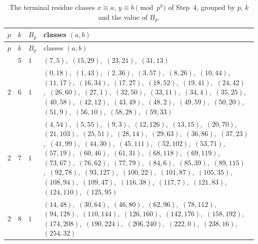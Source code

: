 \documentclass[11pt]{article}
\begin{document}
\begingroup\small
\setlength{\LTcapwidth}{\textwidth}
\begin{longtable}{@{}rrl>{\raggedright\arraybackslash}p{}@{}}
\caption{The terminal residue classes $x\equiv a$, $y\equiv b\pmod{p^k}$ of Step~4, grouped by $p$, $k$ and the value of $B_p$.}\label{tab:local}\\
\hline $p$ & $k$ & $B_p$ & classes $(a,b)$\\\hline\endfirsthead
\hline $p$ & $k$ & $B_p$ & classes $(a,b)$\\\hline\endhead\hline\endfoot
2 & 5 & $1$ & $(7,5)$,\allowbreak\ $(15,29)$,\allowbreak\ $(23,21)$,\allowbreak\ $(31,13)$\\
2 & 6 & $1$ & $(0,18)$,\allowbreak\ $(1,43)$,\allowbreak\ $(2,36)$,\allowbreak\ $(3,57)$,\allowbreak\ $(8,26)$,\allowbreak\ $(10,44)$,\allowbreak\ $(11,17)$,\allowbreak\ $(16,34)$,\allowbreak\ $(17,27)$,\allowbreak\ $(18,52)$,\allowbreak\ $(19,41)$,\allowbreak\ $(24,42)$,\allowbreak\ $(26,60)$,\allowbreak\ $(27,1)$,\allowbreak\ $(32,50)$,\allowbreak\ $(33,11)$,\allowbreak\ $(34,4)$,\allowbreak\ $(35,25)$,\allowbreak\ $(40,58)$,\allowbreak\ $(42,12)$,\allowbreak\ $(43,49)$,\allowbreak\ $(48,2)$,\allowbreak\ $(49,59)$,\allowbreak\ $(50,20)$,\allowbreak\ $(51,9)$,\allowbreak\ $(56,10)$,\allowbreak\ $(58,28)$,\allowbreak\ $(59,33)$\\
2 & 7 & $1$ & $(4,54)$,\allowbreak\ $(5,55)$,\allowbreak\ $(9,3)$,\allowbreak\ $(12,126)$,\allowbreak\ $(13,15)$,\allowbreak\ $(20,70)$,\allowbreak\ $(21,103)$,\allowbreak\ $(25,51)$,\allowbreak\ $(28,14)$,\allowbreak\ $(29,63)$,\allowbreak\ $(36,86)$,\allowbreak\ $(37,23)$,\allowbreak\ $(41,99)$,\allowbreak\ $(44,30)$,\allowbreak\ $(45,111)$,\allowbreak\ $(52,102)$,\allowbreak\ $(53,71)$,\allowbreak\ $(57,19)$,\allowbreak\ $(60,46)$,\allowbreak\ $(61,31)$,\allowbreak\ $(68,118)$,\allowbreak\ $(69,119)$,\allowbreak\ $(73,67)$,\allowbreak\ $(76,62)$,\allowbreak\ $(77,79)$,\allowbreak\ $(84,6)$,\allowbreak\ $(85,39)$,\allowbreak\ $(89,115)$,\allowbreak\ $(92,78)$,\allowbreak\ $(93,127)$,\allowbreak\ $(100,22)$,\allowbreak\ $(101,87)$,\allowbreak\ $(105,35)$,\allowbreak\ $(108,94)$,\allowbreak\ $(109,47)$,\allowbreak\ $(116,38)$,\allowbreak\ $(117,7)$,\allowbreak\ $(121,83)$,\allowbreak\ $(124,110)$,\allowbreak\ $(125,95)$\\
2 & 8 & $1$ & $(14,48)$,\allowbreak\ $(30,64)$,\allowbreak\ $(46,80)$,\allowbreak\ $(62,96)$,\allowbreak\ $(78,112)$,\allowbreak\ $(94,128)$,\allowbreak\ $(110,144)$,\allowbreak\ $(126,160)$,\allowbreak\ $(142,176)$,\allowbreak\ $(158,192)$,\allowbreak\ $(174,208)$,\allowbreak\ $(190,224)$,\allowbreak\ $(206,240)$,\allowbreak\ $(222,0)$,\allowbreak\ $(238,16)$,\allowbreak\ $(254,32)$\\

\end{longtable}
\end{document}
